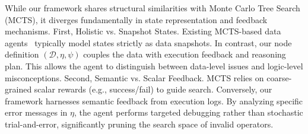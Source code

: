 While our framework shares structural similarities with Monte Carlo Tree Search (MCTS), it diverges fundamentally in state representation and feedback mechanisms. First, {Holistic vs. Snapshot States.} Existing MCTS-based data agents~\cite{ge2025monteprep} typically model states strictly as data snapshots. In contrast, our node definition $(\mathcal{D}, \eta, \psi)$ couples the data with {execution feedback} and {reasoning plan}. This allows the agent to distinguish between data-level issues and logic-level misconceptions. Second, {Semantic vs. Scalar Feedback.} MCTS relies on coarse-grained scalar rewards (e.g., success/fail) to guide search. Conversely, our framework harnesses {semantic feedback} from execution logs. By analyzing specific error messages in $\eta$, the agent performs targeted debugging rather than stochastic trial-and-error, significantly pruning the search space of invalid operators.
